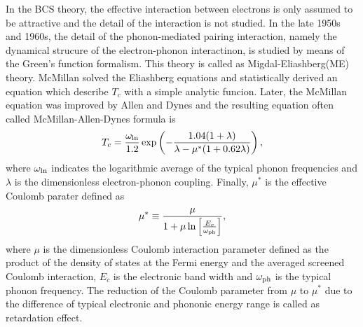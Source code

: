 In the BCS theory, the effective interaction between electrons is only assumed to be attractive and
the detail of the interaction is not studied.
In the late 1950s and 1960s, the detail of the phonon-mediated pairing interaction, namely the 
dynamical strucure of the electron-phonon interactinon, is studied by means of the Green's function 
formalism\cite{Migdal1958,Nambu1960,Eliashberg1960,Morel1962,Schrieffer1964,Scalapino1966}. 
This theory is called as Migdal-Eliashberg(ME) theory.
McMillan\cite{McMillan1968} solved the Eliashberg equations\cite{Parks1969}
and statistically derived an equation which describe $T_c$ with a simple analytic funcion. 
Later, the McMillan equation was improved by Allen and Dynes\cite{AllenDynes} and the resulting 
equation often called McMillan-Allen-Dynes formula is
%
\begin{equation}
	T_c = \frac{\omega_{\rm ln}}{1.2} \exp \left( -\frac{1.04(1+\lambda)}
	{\lambda-\mu^{\ast}(1+0.62\lambda)} \right),
	\label{eq:Allen}
\end{equation}
%
where $\omega_{\rm ln}$ indicates the logarithmic average of the typical phonon frequencies and
$\lambda$ is the dimensionless electron-phonon coupling. Finally, $\mu^{\ast}$ is the effective Coulomb
parater defined as
%
\begin{equation}
	\mu^{\ast} \equiv \frac{\mu}{1 + \mu \ln \left[ \frac{E_c}{\omega_{\rm ph}} \right]},
	\label{eq:mustar}
\end{equation}
%
where $\mu$ is the dimensionless Coulomb interaction parameter defined as the product of the density
of states at the Fermi energy and the averaged screened Coulomb interaction, $E_c$ is the
electronic band width and $\omega_{\rm ph}$ is the typical phonon frequency.
The reduction of the Coulomb parameter from $\mu$ to $\mu^{\ast}$ due to the difference of 
typical electronic and phononic energy range is called as retardation effect\cite{Bogo1958,Morel1962}.


